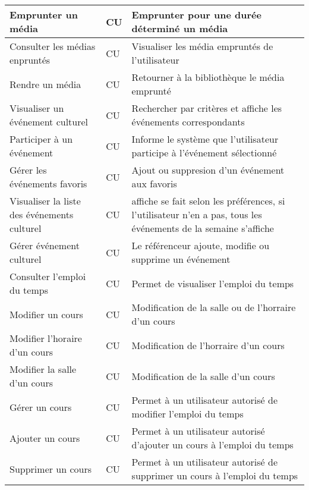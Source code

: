 \begin{center}
\begin{longtable}[c]{|p{100pt}| p{50pt}| p{250pt}|}
	Emprunter un média 	&	CU	& Emprunter pour une durée déterminé un média\\ \hline
	
	Consulter les médias enpruntés	&	CU	& Visualiser les média empruntés de l'utilisateur\\ \hline
	
	Rendre un média 	&	CU	& Retourner à la bibliothèque le média emprunté\\ \hline
	
	Visualiser un événement culturel 	&	CU	& Rechercher par critères et affiche les événements correspondants\\ \hline
	
	Participer à un événement 	&	CU	& Informe le système que l'utilisateur participe à l'événement sélectionné\\ \hline
	
	Gérer les événements favoris		&	CU	& Ajout ou suppresion d'un événement aux favoris\\ \hline
	
	Visualiser la liste des événements culturel 	&	CU	& affiche se fait selon les préférences, si l'utilisateur n'en a pas, tous les événements de la semaine s'affiche\\ \hline
	
	Gérer événement culturel		&	CU	& Le référenceur ajoute, modifie ou supprime un événement\\ \hline
	
	Consulter l'emploi du temps		&	CU	& Permet de visualiser l'emploi du temps\\ \hline
	
	Modifier un cours	&	CU	& Modification de la salle ou de l'horraire d'un cours\\ \hline
	
	Modifier l'horaire d'un cours	&	CU	& Modification de l'horraire d'un cours\\ \hline
	
	Modifier la salle d'un cours	&	CU	& Modification de la salle d'un cours\\ \hline
	
	Gérer un cours	&	CU	& Permet à un utilisateur autorisé de modifier l'emploi du temps \\ \hline
	
	Ajouter un cours	&	CU	& Permet à un utilisateur autorisé d'ajouter un cours à l'emploi du temps\\ \hline
	
	Supprimer un cours	&	CU	& Permet à un utilisateur autorisé de supprimer un cours à l'emploi du temps\\ \hline
	

\end{longtable}
\end{center}
